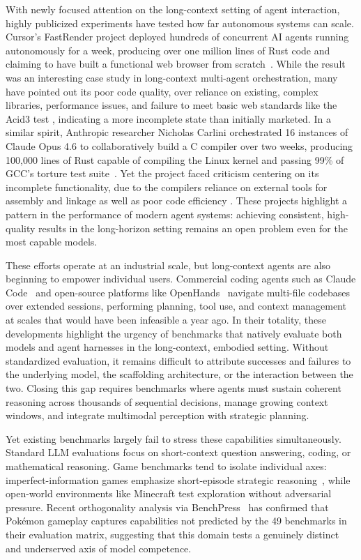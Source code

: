 With newly focused attention on the long-context setting of agent interaction, highly publicized experiments have tested how far autonomous systems can scale. Cursor's FastRender project deployed hundreds of concurrent AI agents running autonomously for a week, producing over one million lines of Rust code and claiming to have  built a functional web browser from scratch~\citep{cursor2026scalingagents}. While the result was an interesting case study in long-context multi-agent orchestration, many have pointed out its poor code quality, over reliance on existing, complex libraries, performance issues, and failure to meet basic web standards like the Acid3 test , indicating a more incomplete state than initially marketed. In a similar spirit, Anthropic researcher Nicholas Carlini orchestrated 16 instances of Claude Opus 4.6 to collaboratively build a C compiler over two weeks, producing 100,000 lines of Rust capable of compiling the Linux kernel and passing 99\% of GCC's torture test suite~\citep{carlini2026ccompiler}. Yet the project faced criticism centering on its incomplete functionality, due to the compilers reliance on external tools for assembly and linkage as well as poor code efficiency . These projects highlight a pattern in the performance of modern agent systems: achieving consistent, high-quality results in the long-horizon setting remains an open problem even for the most capable models.

These efforts operate at an industrial scale, but long-context agents are also beginning to empower individual users. Commercial coding agents such as Claude Code~\citep{anthropic2025claudecode} and open-source platforms like OpenHands~\citep{wang2024openhands} navigate multi-file codebases over extended sessions, performing planning, tool use, and context management at scales that would have been infeasible a year ago. In their totality, these developments highlight the urgency of  benchmarks that natively evaluate both models and agent harnesses in the long-context, embodied setting. Without standardized evaluation, it remains difficult to attribute successes and failures to the underlying model, the scaffolding architecture, or the interaction between the two. Closing this gap requires benchmarks where agents must sustain coherent reasoning across thousands of sequential decisions, manage growing context windows, and integrate multimodal perception with strategic planning.

Yet existing benchmarks largely fail to stress these capabilities simultaneously. Standard LLM evaluations focus on short-context question answering, coding, or mathematical reasoning. Game benchmarks tend to isolate individual axes: imperfect-information games emphasize short-episode strategic reasoning~\citep{brown2018superhuman, brown2019superhuman}, while open-world environments like Minecraft test exploration without adversarial pressure. Recent orthogonality analysis via BenchPress~\citep{papailiopoulos2026benchpress} has confirmed that Pok\'{e}mon gameplay captures capabilities not predicted by the 49 benchmarks in their evaluation matrix, suggesting that this domain tests a genuinely distinct and underserved axis of model competence.

